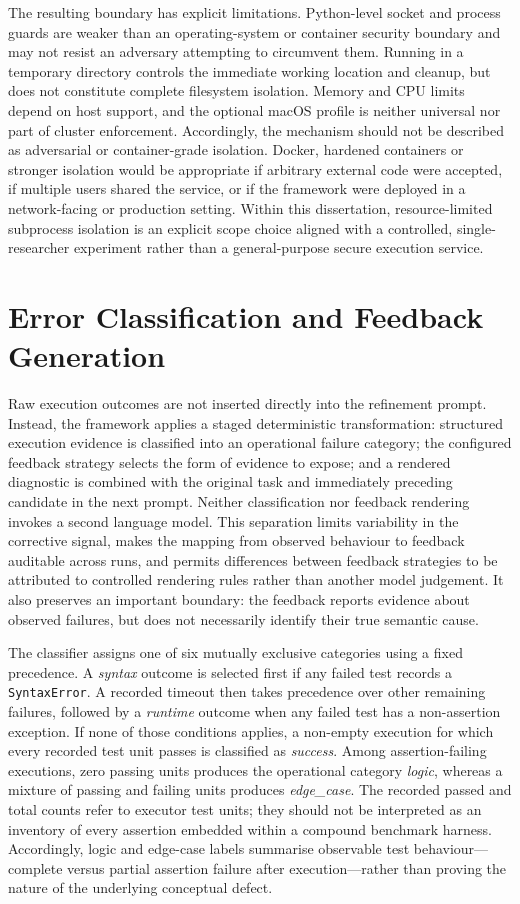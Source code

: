 The resulting boundary has explicit limitations. Python-level socket and process guards are weaker than an operating-system or container security boundary and may not resist an adversary attempting to circumvent them. Running in a temporary directory controls the immediate working location and cleanup, but does not constitute complete filesystem isolation. Memory and CPU limits depend on host support, and the optional macOS profile is neither universal nor part of cluster enforcement. Accordingly, the mechanism should not be described as adversarial or container-grade isolation. Docker, hardened containers or stronger isolation would be appropriate if arbitrary external code were accepted, if multiple users shared the service, or if the framework were deployed in a network-facing or production setting. Within this dissertation, resource-limited subprocess isolation is an explicit scope choice aligned with a controlled, single-researcher experiment rather than a general-purpose secure execution service.

\section{Error Classification and Feedback Generation}

Raw execution outcomes are not inserted directly into the refinement prompt. Instead, the framework applies a staged deterministic transformation: structured execution evidence is classified into an operational failure category; the configured feedback strategy selects the form of evidence to expose; and a rendered diagnostic is combined with the original task and immediately preceding candidate in the next prompt. Neither classification nor feedback rendering invokes a second language model. This separation limits variability in the corrective signal, makes the mapping from observed behaviour to feedback auditable across runs, and permits differences between feedback strategies to be attributed to controlled rendering rules rather than another model judgement. It also preserves an important boundary: the feedback reports evidence about observed failures, but does not necessarily identify their true semantic cause.

The classifier assigns one of six mutually exclusive categories using a fixed precedence. A \emph{syntax} outcome is selected first if any failed test records a \texttt{SyntaxError}. A recorded timeout then takes precedence over other remaining failures, followed by a \emph{runtime} outcome when any failed test has a non-assertion exception. If none of those conditions applies, a non-empty execution for which every recorded test unit passes is classified as \emph{success}. Among assertion-failing executions, zero passing units produces the operational category \emph{logic}, whereas a mixture of passing and failing units produces \emph{edge\_case}. The recorded passed and total counts refer to executor test units; they should not be interpreted as an inventory of every assertion embedded within a compound benchmark harness. Accordingly, logic and edge-case labels summarise observable test behaviour---complete versus partial assertion failure after execution---rather than proving the nature of the underlying conceptual defect.

